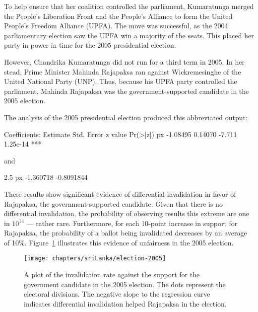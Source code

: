 To help ensure that her coalition controlled the parliament, Kumaratunga merged the People's Liberation Front and the People's Alliance to form the United People's Freedom Alliance (UPFA). The move was successful, as the 2004 parliamentary election saw the UPFA win a majority of the seats.\cite{hensman-2010} This placed her party in power in time for the 2005 presidential election.

However, Chandrika Kumaratunga did not run for a third term in 2005. In her stead, Prime Minister Mahinda Rajapaksa ran against Wickremesinghe of the United National Party (UNP). Thus, because his UPFA party controlled the parliament, Mahinda Rajapaksa was the government-supported candidate in the 2005 election.\cite{hensman-2010,uyangoda-2010b}

The analysis of the 2005 presidential election produced this abbreviated output:

\begin{codeout}
Coefficients:
              Estimate Std. Error z value Pr(>|z|)
px            -1.08495    0.14070  -7.711 1.25e-14 ***
\end{codeout}

\noindent
and

\begin{codeout}
                  2.5 %
px            -1.360718 -0.8091844
\end{codeout}

\noindent
These results show significant evidence of differential invalidation in favor of Rajapaksa, the government-supported candidate. Given that there is no differential invalidation, the probability of observing results this extreme are one in $10^{14}$ --- rather rare. Furthermore, for each 10-point increase in support for Rajapaksa, the probability of a ballot being invalidated decreases by an average of 10\%. Figure~\ref{fig:sri-elx2005} illustrates this evidence of unfairness in the 2005 election.


\begin{figure}[t]
\texttt{[image: chapters/sriLanka/election-2005]}
\caption[Invalidation plot for the 2005 presidential election]{A plot of the invalidation rate against the support for the government candidate in the 2005 election. The dots represent the electoral divisions. The negative slope to the regression curve indicates differential invalidation helped Rajapaksa in the election.}
\label{fig:sri-elx2005}
\end{figure}


